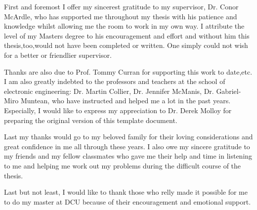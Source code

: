 

\begin{acknowledgements}      %

First and foremost I offer my sincerest gratitude to my supervisor, Dr. Conor McArdle, who has supported me throughout my thesis with his patience and knowledge whilst allowing me the room to work in my own way. I attribute the level of my Masters degree to his encouragement and effort and without him this thesis,too,would not have been completed or written. One simply could not wish for a better or friendlier supervisor.

Thanks are also due to Prof. Tommy Curran for supporting this work to date,etc. I am also greatly indebted to the professors and teachers at the school of electronic engineering: Dr. Martin Collier, Dr. Jennifer McManis, Dr. Gabriel-Miro Muntean, who have instructed and helped me a lot in the past years. Especially, I would like to express my appreciation to Dr. Derek Molloy for preparing the original version of this template document.   

Last my thanks would go to my beloved family for their loving considerations and great confidence in me all through these years. I also owe my sincere gratitude to my friends and my fellow classmates who gave me their help and time in listening to me and helping me work out my problems during the difficult course of the thesis.

Last but not least, I would like to thank those who relly made it possible for me to do my master at DCU because of their encouragement and emotional support.

\end{acknowledgements}


